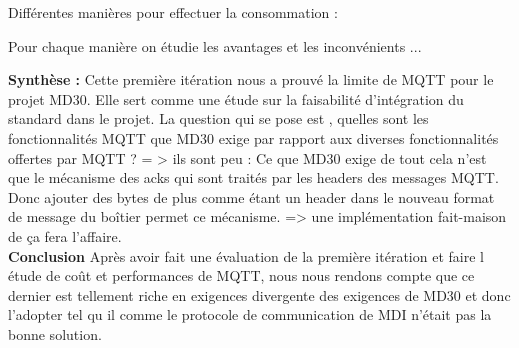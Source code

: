     Différentes manières pour effectuer la consommation : 

    Pour chaque manière on étudie les avantages et les inconvénients ... 



    \textbf{Synthèse :}
    Cette première itération nous a prouvé la limite de MQTT pour le projet MD30. Elle sert comme une étude 
    sur la faisabilité d'intégration du standard dans le projet.
    La question qui se pose est , quelles sont les fonctionnalités MQTT que MD30 exige par rapport aux 
    diverses fonctionnalités offertes par MQTT ? = > ils sont peu : 
    Ce que MD30 exige de tout cela n’est que le mécanisme des acks qui sont traités par les headers des messages MQTT. 
    Donc ajouter des bytes de plus comme étant un header dans le nouveau format de message du boîtier permet ce mécanisme. 
    => une implémentation fait-maison de ça fera l'affaire. \\




    \textbf{Conclusion} \break
            Après avoir fait une évaluation de la première itération et faire l étude de coût et performances de MQTT, 
        nous nous rendons compte que ce dernier est tellement riche en exigences divergente des exigences de MD30 et 
        donc l'adopter tel qu il comme le protocole de communication de MDI n’était pas la bonne solution. 


    



  


